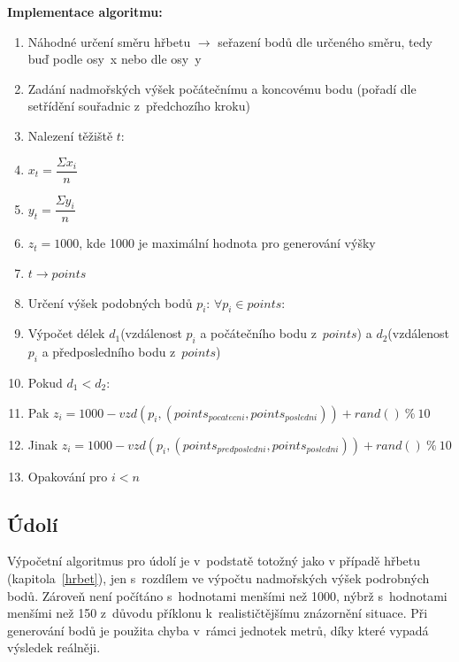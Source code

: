 \documentclass[a4paper, 12pt, oneside, titlepage]{article} %
\begin{document}
\textbf{Implementace algoritmu:}
\begin{enumerate}
\item Náhodné určení směru hřbetu $\rightarrow$ seřazení bodů dle určeného směru, tedy buď podle osy~x nebo dle osy~y
\item Zadání nadmořských výšek počátečnímu a koncovému bodu (pořadí dle setřídění souřadnic z~předchozího kroku)
\item Nalezení těžiště $t$:
\item \quad $x_t= \dfrac{\Sigma x_i}{n}$ 
\item \quad $y_t= \dfrac{\Sigma y_i}{n}$
\item \quad $z_t= 1000$, kde 1000 je maximální hodnota pro generování výšky
\item $t \rightarrow points$
\item Určení výšek podobných bodů $p_i$: $\forall p_i \in points $:
\item \quad Výpočet délek $d_1$(vzdálenost $p_i$ a počátečního bodu z~$points$) a $d_2$(vzdálenost $p_i$ a předposledního bodu z~$points$) 
\item \quad Pokud $d_1<d_2$:
\item \quad \quad Pak $z_i=1000-vzd(p_i,(points_{pocatecni},points_{posledni}))+rand()~\%~10$
\item \quad \quad Jinak $z_i=1000-vzd(p_i,(points_{predposledni},points_{posledni}))+rand()~\%~10$
\item Opakování pro $i<n$
\end{enumerate}

\subsection{Údolí}
Výpočetní algoritmus pro údolí je v~podstatě totožný jako v případě hřbetu (kapitola~\ref{hrbet}), jen s~rozdílem ve výpočtu nadmořských výšek podrobných bodů. Zároveň není počítáno s~hodnotami menšími než 1000, nýbrž s~hodnotami menšími než 150 z~důvodu příklonu k~realističtějšímu znázornění situace. Při generování bodů je použita chyba v~rámci jednotek metrů, díky které vypadá výsledek reálněji. 
\end{document}
